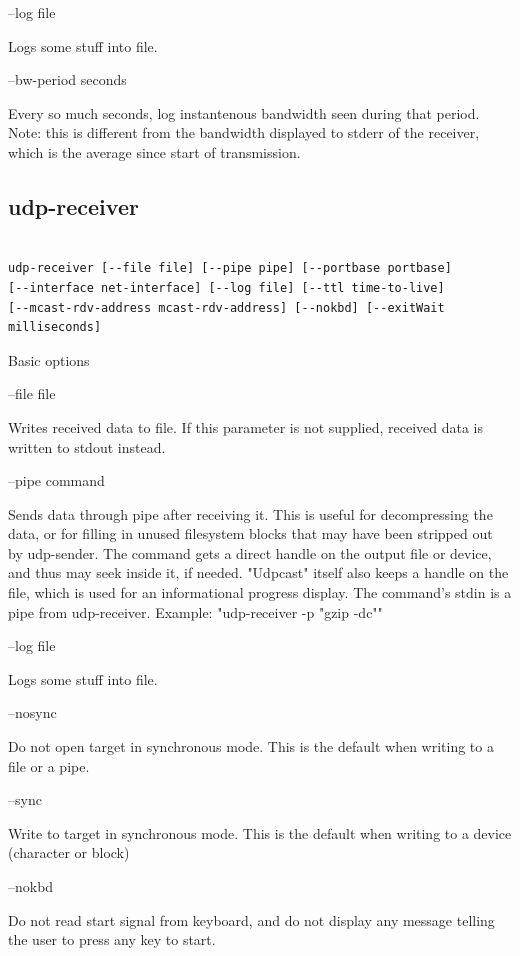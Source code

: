 --log file

    Logs some stuff into file. 

--bw-period seconds

    Every so much seconds, log instantenous bandwidth seen during that
period. Note: this is different from the bandwidth displayed to stderr of
the receiver, which is the average since start of transmission. 


\pagebreak
\subsection{udp-receiver}
\begin{lstlisting}[caption= Command line flags for udp-receiver]

udp-receiver [--file file] [--pipe pipe] [--portbase portbase]
[--interface net-interface] [--log file] [--ttl time-to-live]
[--mcast-rdv-address mcast-rdv-address] [--nokbd] [--exitWait milliseconds] 

\end{lstlisting}


Basic options\cite{man:udp-receiver}

--file file

    Writes received data to file. If this parameter is not supplied,
received data is written to stdout instead. 

--pipe command

    Sends data through pipe after receiving it. This is useful for
decompressing the data, or for filling in unused filesystem blocks that may
have been stripped out by udp-sender. The command gets a direct handle on
the output file or device, and thus may seek inside it, if needed.
"Udpcast" itself also keeps a handle on the file, which is used for an
informational progress display. The command's stdin is a pipe from
udp-receiver. Example: "udp-receiver -p "gzip -dc"" 

--log file

    Logs some stuff into file. 

--nosync

    Do not open target in synchronous mode. This is the default when
writing to a file or a pipe. 

--sync

    Write to target in synchronous mode. This is the default when writing
to a device (character or block) 

--nokbd

    Do not read start signal from keyboard, and do not display any message
telling the user to press any key to start. 

